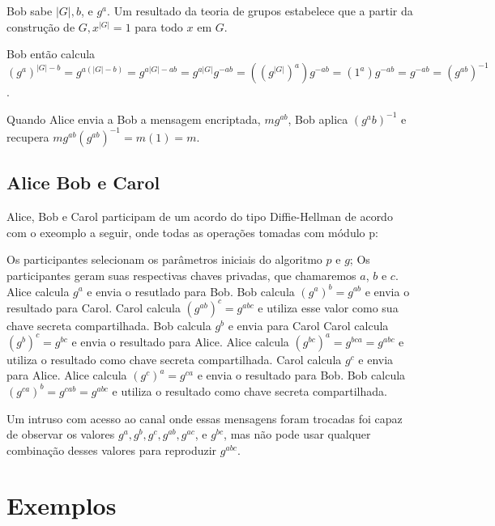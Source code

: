 \documentclass[a4paper,11pt]{article}
\theoremstyle{mytheor}
\begin{document}
    Bob sabe $|G|, b$, e $g^a$. Um resultado da teoria de grupos estabelece que a partir da construção de $G, x^{|G|} = 1$ para todo $x$ em $G$.
    
    Bob então calcula $(g^a)^{|G|-b} = g^{a(|G|-b)} = g^{a|G|-ab} = g^{a|G|}g^{-ab} = ((g^{|G|})^a)g^{-ab}=(1^a)g^{-ab}=g^{-ab}=(g^{ab})^{-1}$.
    
    Quando Alice envia a Bob a mensagem encriptada, $mg^{ab}$, Bob aplica $(g^ab)^{-1}$ e recupera $mg^{ab}(g^{ab})^{-1} = m(1) = m$.

\subsection*{Alice Bob e Carol}

Alice, Bob e Carol participam de um acordo do tipo Diffie-Hellman de acordo com o exeomplo a seguir, onde todas as operações tomadas com módulo p:

    Os participantes selecionam os parâmetros iniciais do algoritmo $p$ e $g$;
    Os participantes geram suas respectivas chaves privadas, que chamaremos $a$, $b$ e $c$.
    Alice calcula $g^a$ e envia o resutlado para Bob.
    Bob calcula $(g^a)^b = g^{ab}$ e envia o resultado para Carol.
    Carol calcula $(g^{ab})^c = g^{abc}$ e utiliza esse valor como sua chave secreta compartilhada.
    Bob calcula $g^b$ e envia para Carol
    Carol calcula $(g^b)^c = g^{bc}$ e envia o resultado para Alice.
    Alice calcula $(g^{bc})^a = g^{bca} = g^{abc}$ e utiliza o resultado como chave secreta compartilhada.
    Carol calcula $g^c$ e envia para Alice.
    Alice calcula $(g^c)^a = g^{ca}$ e envia o resultado para Bob.
    Bob calcula $(g^{ca})^b = g^{cab} = g^{abc}$ e utiliza o resultado como chave secreta compartilhada.

Um intruso com acesso ao canal onde essas mensagens foram trocadas foi capaz de observar os valores $g^a, g^b, g^c, g^{ab}, g^{ac}$, e $g^{bc}$, mas não pode usar qualquer combinação desses valores para reproduzir $g^{abc}$.

\section*{Exemplos}
\end{document}

